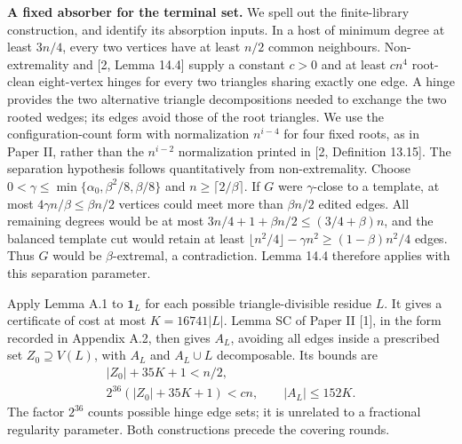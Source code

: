 \documentclass[english,11pt,a4paper]{article}
\begin{document}
\textbf{A fixed absorber for the terminal set.} We spell out the finite-library construction, and identify its absorption inputs. In a host of minimum degree at least \(3n/4\), every two vertices have at least \(n/2\) common neighbours. Non-extremality and {[}2, Lemma 14.4{]} supply a constant \(c>0\) and at least \(cn^4\) root-clean eight-vertex hinges for every two triangles sharing exactly one edge. A hinge provides the two alternative triangle decompositions needed to exchange the two rooted wedges; its edges avoid those of the root triangles. We use the configuration-count form with normalization \(n^{i-4}\) for four fixed roots, as in Paper II, rather than the \(n^{i-2}\) normalization printed in {[}2, Definition 13.15{]}. The separation hypothesis follows quantitatively from non-extremality. Choose \(0<\gamma\le\min\{\alpha_0,\beta^2/8,\beta/8\}\) and \(n\ge\lceil2/\beta\rceil\). If \(G\) were \(\gamma\)-close to a template, at most \(4\gamma n/\beta\le\beta n/2\) vertices could meet more than \(\beta n/2\) edited edges. All remaining degrees would be at most \(3n/4+1+\beta n/2\le(3/4+\beta)n\), and the balanced template cut would retain at least \(\lfloor n^2/4\rfloor-\gamma n^2\ge(1-\beta)n^2/4\) edges. Thus \(G\) would be \(\beta\)-extremal, a contradiction. Lemma 14.4 therefore applies with this separation parameter.

Apply Lemma A.1 to \(\mathbf1_L\) for each possible triangle-divisible residue \(L\). It gives a certificate of cost at most \(K=16741|L|\). Lemma SC of Paper II {[}1{]}, in the form recorded in Appendix A.2, then gives \(A_L\), avoiding all edges inside a prescribed set \(Z_0\supseteq V(L)\), with \(A_L\) and \(A_L\cup L\) decomposable. Its bounds are \[\begin{gathered}
|Z_0|+35K+1<n/2,\\
2^{36}(|Z_0|+35K+1)<cn,\qquad |A_L|\le152K.
\end{gathered}\] The factor \(2^{36}\) counts possible hinge edge sets; it is unrelated to a fractional regularity parameter. Both constructions precede the covering rounds.
\end{document}
